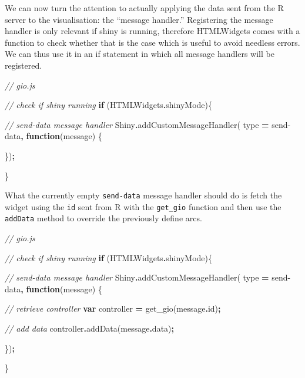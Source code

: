 \documentclass[
]{krantz}
\makeatletter
\newenvironment{Shaded}{\begin{snugshade}}{\end{snugshade}}
\newcommand{\AttributeTok}[1]{\textcolor[rgb]{0.61,0.61,0.61}{#1}}
\newcommand{\CommentTok}[1]{\textcolor[rgb]{0.37,0.37,0.37}{\textit{#1}}}
\newcommand{\ControlFlowTok}[1]{\textcolor[rgb]{0.27,0.27,0.27}{\textbf{#1}}}
\newcommand{\FunctionTok}[1]{\textcolor[rgb]{0,0,0}{#1}}
\newcommand{\KeywordTok}[1]{\textcolor[rgb]{0.27,0.27,0.27}{\textbf{#1}}}
\newcommand{\NormalTok}[1]{#1}
\newcommand{\OperatorTok}[1]{\textcolor[rgb]{0.43,0.43,0.43}{\textbf{#1}}}
\newcommand{\StringTok}[1]{\textcolor[rgb]{0.5,0.5,0.5}{#1}}
\newenvironment{kframe}{%
\medskip{}
\setlength{\fboxsep}{.8em}
 \def\at@end@of@kframe{}%
 \ifinner\ifhmode%
  \def\at@end@of@kframe{\end{minipage}}%
  \begin{minipage}{\columnwidth}%
 \fi\fi%
 \def\FrameCommand##1{\hskip\@totalleftmargin \hskip-\fboxsep
 \colorbox{shadecolor}{##1}\hskip-\fboxsep
     \hskip-\linewidth \hskip-\@totalleftmargin \hskip\columnwidth}%
 \MakeFramed {\advance\hsize-\width
   \@totalleftmargin\z@ \linewidth\hsize
   \@setminipage}}%
 {\par\unskip\endMakeFramed%
 \at@end@of@kframe}
\renewenvironment{Shaded}{\begin{kframe}}{\end{kframe}}
\makeatother
\begin{document}
We can now turn the attention to actually applying the data sent from the R server to the visualisation: the ``message handler.'' Registering the message handler is only relevant if shiny is running, therefore HTMLWidgets comes with a function to check whether that is the case which is useful to avoid needless errors. We can thus use it in an if statement in which all message handlers will be registered.

\begin{Shaded}
\begin{Highlighting}[]
\CommentTok{// gio.js}

\CommentTok{// check if shiny running}
\ControlFlowTok{if}\NormalTok{ (HTMLWidgets}\OperatorTok{.}\AttributeTok{shinyMode}\NormalTok{)\{}

  \CommentTok{// send{-}data message handler}
\NormalTok{  Shiny}\OperatorTok{.}\FunctionTok{addCustomMessageHandler}\NormalTok{(}
\NormalTok{    type }\OperatorTok{=} \StringTok{\textquotesingle{}send{-}data\textquotesingle{}}\OperatorTok{,} \KeywordTok{function}\NormalTok{(message) \{}

\NormalTok{  \})}\OperatorTok{;}

\NormalTok{\}}
\end{Highlighting}
\end{Shaded}

What the currently empty \texttt{send-data} message handler should do is fetch the widget using the \texttt{id} sent from R with the \texttt{get\_gio} function and then use the \texttt{addData} method to override the previously define arcs.

\begin{Shaded}
\begin{Highlighting}[]
\CommentTok{// gio.js}

\CommentTok{// check if shiny running}
\ControlFlowTok{if}\NormalTok{ (HTMLWidgets}\OperatorTok{.}\AttributeTok{shinyMode}\NormalTok{)\{}

  \CommentTok{// send{-}data message handler}
\NormalTok{  Shiny}\OperatorTok{.}\FunctionTok{addCustomMessageHandler}\NormalTok{(}
\NormalTok{    type }\OperatorTok{=} \StringTok{\textquotesingle{}send{-}data\textquotesingle{}}\OperatorTok{,} \KeywordTok{function}\NormalTok{(message) \{}

    \CommentTok{// retrieve controller}
    \KeywordTok{var}\NormalTok{ controller }\OperatorTok{=}\NormalTok{ get\_gio(message}\OperatorTok{.}\AttributeTok{id}\NormalTok{)}\OperatorTok{;}

    \CommentTok{// add data}
\NormalTok{    controller}\OperatorTok{.}\FunctionTok{addData}\NormalTok{(message}\OperatorTok{.}\AttributeTok{data}\NormalTok{)}\OperatorTok{;}

\NormalTok{  \})}\OperatorTok{;}

\NormalTok{\}}
\end{Highlighting}
\end{Shaded}
\end{document}
